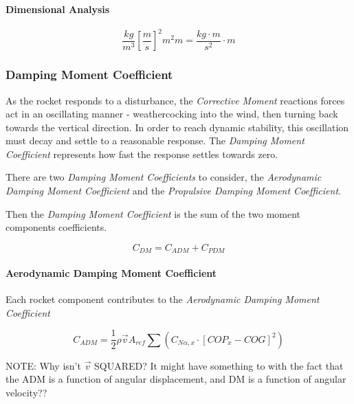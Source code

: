 \documentclass[]{article}
\let\oldparagraph\paragraph
\renewcommand{\paragraph}[1]{\oldparagraph{#1}\mbox{}}
\begin{document}
\paragraph{Dimensional Analysis}\label{dimensional-analysis}

\begin{equation}
\label{eq_c1_dim_anal}
\dfrac{kg}{m^3} \left[ \dfrac{m}{s} \right]^2 m^2 m = \dfrac{kg \cdot m }{s^2} \cdot m 
\end{equation}

\subsubsection{Damping Moment
Coefficient}\label{damping-moment-coefficient}

As the rocket responds to a disturbance, the \emph{Corrective Moment}
reactions forces act in an oscillating manner - weathercocking into the
wind, then turning back towards the vertical direction. In order to
reach dynamic stability, this oscillation must decay and settle to a
reasonable response. The \emph{Damping Moment Coefficient} represents
how fast the response settles towards zero.

There are two \emph{Damping Moment Coefficients} to consider, the
\emph{Aerodynamic Damping Moment Coefficient} and the \emph{Propulsive
Damping Moment Coefficient}.

Then the \emph{Damping Moment Coefficient} is the sum of the two moment
components coefficients.

\begin{equation}
\label{eq_coef_moment_damping}
C_{DM} = C_{ADM} + C_{PDM}
\end{equation}

\paragraph{Aerodynamic Damping Moment
Coefficient}\label{aerodynamic-damping-moment-coefficient}

Each rocket component contributes to the \emph{Aerodynamic Damping
Moment Coefficient}

\begin{equation}
\label{eq_coef_moment_damping_aero}
C_{ADM} = \dfrac{1}{2} \rho \vec{v} A_{ref} \sum \left( C_{N \alpha,x} \cdot \left[ COP_{x} - COG \right]^2  \right) 
\end{equation}

NOTE: Why isn't \(\vec{v}\) SQUARED? It might have something to with the
fact that the ADM is a function of angular displacement, and DM is a
function of angular velocity??
\end{document}
